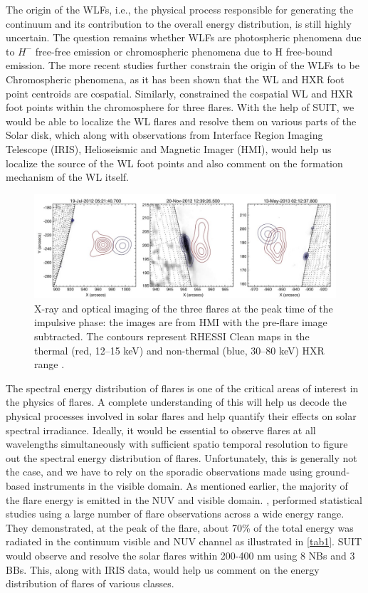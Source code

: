 {The origin of the WLFs, i.e., the physical process responsible for generating the continuum and its contribution to the overall energy distribution, is still highly uncertain. The question remains whether WLFs are photospheric phenomena due to $H^{-}$ free-free emission or chromospheric phenomena due to H free-bound emission. The more recent studies further constrain the origin of the WLFs to be Chromospheric phenomena, as it has been shown that the WL and HXR foot point centroids are cospatial. Similarly, \cite{krucker15} constrained the cospatial WL and HXR foot points within the chromosphere for three flares. With the help of SUIT, we would be able to localize the WL flares and resolve them on various parts of the Solar disk, which along with observations from Interface Region Imaging Telescope (IRIS), Helioseismic and Magnetic Imager (HMI), would help us localize the source of the WL foot points and also comment on the formation mechanism of the WL itself.

\begin{figure}
    \centering
    \includegraphics[width = \linewidth]{Figures/Krucker_2015_ApJ_802_19_page-0004.jpg}
    \caption{X-ray and optical imaging of the three flares at the peak time of the impulsive phase: the images are from HMI with the pre-flare image subtracted. The contours represent RHESSI Clean maps in the thermal (red, 12–15 keV) and non-thermal (blue, 30–80 keV) HXR range \citep{krucker15}.}
    \label{fig1}
\end{figure}

The spectral energy distribution of flares is one of the critical areas of interest in the physics of flares. A complete understanding of this will help us decode the physical processes involved in solar flares and help quantify their effects on solar spectral irradiance. Ideally, it would be essential to observe flares at all wavelengths simultaneously with sufficient spatio temporal resolution to figure out the spectral energy distribution of flares. Unfortunately, this is generally not the case, and we have to rely on the sporadic observations made using ground-based instruments in the visible domain. As mentioned earlier, the majority of the flare energy is emitted in the NUV and visible domain. \cite{kretzschmar10,kretzschmar11}, performed statistical studies using a large number of flare observations across a wide energy range. They demonstrated, at the peak of the flare, about 70\% of the total energy was radiated in the continuum visible and NUV channel as illustrated in \ref{tab1}. SUIT would observe and resolve the solar flares within 200-400 nm using 8 NBs and 3 BBs. This, along with IRIS data, would help us comment on the energy distribution of flares of various classes.

}
